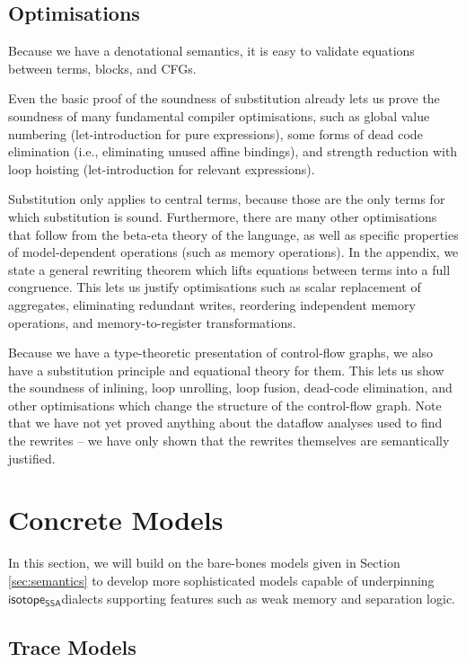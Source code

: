 \documentclass[acmsmall,screen,review]{acmart}
\newcommand{\ms}[1]{\ensuremath{\mathsf{#1}}}
\newcommand{\isotopessa}{\ms{isotope_{SSA}}}
\begin{document}
\subsection{Optimisations}

Because we have a denotational semantics, it is easy to validate equations
between terms, blocks, and CFGs.

Even the basic proof of the soundness of substitution already lets us prove the
soundness of many fundamental compiler optimisations, such as global value
numbering (let-introduction for pure expressions), some forms of dead code
elimination (i.e., eliminating unused affine bindings), and strength reduction
with loop hoisting (let-introduction for relevant expressions). 

Substitution only applies to central terms, because those are the only terms for
which substitution is sound. Furthermore, there are many other optimisations
that follow from the beta-eta theory of the language, as well as specific
properties of model-dependent operations (such as memory operations). In the
appendix, we state a general rewriting theorem which lifts equations between
terms into a full congruence. This lets us justify optimisations such as scalar
replacement of aggregates, eliminating redundant writes, reordering independent
memory operations, and memory-to-register transformations.

Because we have a type-theoretic presentation of control-flow graphs, we also
have a substitution principle and equational theory for them. This lets us show
the soundness of inlining, loop unrolling, loop fusion, dead-code elimination,
and other optimisations which change the structure of the control-flow graph.
Note that we have not yet proved anything about the dataflow analyses used to
find the rewrites -- we have only shown that the rewrites themselves are
semantically justified.

\section{Concrete Models}

In this section, we will build on the bare-bones models given in Section
\ref{sec:semantics} to develop more sophisticated models capable of underpinning
\isotopessa dialects supporting features such as weak memory and separation
logic.

\subsection{Trace Models}
\end{document}
